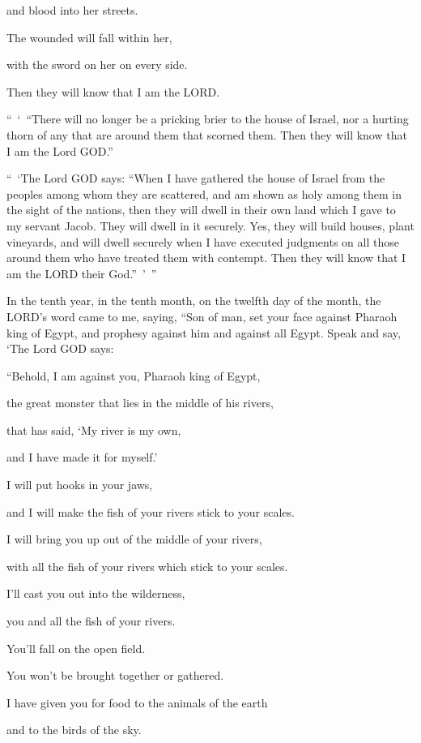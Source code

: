 and blood into her streets.

The wounded will fall within her,

with the sword on her on every side.

Then they will know that I am the LORD.

\myverse{}“ ‘ “There will no longer be a pricking brier to the house of
Israel, nor a hurting thorn of any that are around them that scorned them. Then they will know that I
am the Lord GOD.”

\myverse{}“ ‘The Lord GOD says: “When I have gathered the house of Israel
from the peoples among whom they are scattered, and am shown as holy among them in the sight of the nations,
then they will dwell in their own land which I gave to my servant Jacob.
\myverse{}They will dwell in it securely. Yes, they will build houses, plant vineyards,
and will dwell securely when I have executed judgments on all those around them who have treated them
with contempt. Then they will know that I am the LORD their God.” ’ ”


\mychapter{} \myverse*{}In the tenth year, in the tenth month, on the twelfth day of the
month, the LORD’s word came to me, saying,
\myverse{}“Son of man, set your face against Pharaoh king of Egypt, and prophesy against
him and against all Egypt.
\myverse{}Speak and say, ‘The Lord GOD says:

“Behold, I am against you, Pharaoh king of Egypt,

the great monster that lies in the middle of his rivers,

that has said, ‘My river is my own,

and I have made it for myself.’

\myverse{}I will put hooks in your jaws,

and I will make the fish of your rivers stick to your scales.

I will bring you up out of the middle of your rivers,

with all the fish of your rivers which stick to your scales.

\myverse{}I’ll cast you out into the wilderness,

you and all the fish of your rivers.

You’ll fall on the open field.

You won’t be brought together or gathered.

I have given you for food to the animals of the earth

and to the birds of the sky.

